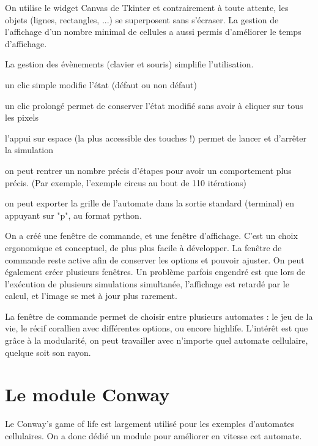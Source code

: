 \documentclass[a4paper]{article}
\begin{document}
On utilise le widget Canvas de Tkinter et contrairement à toute attente, les objets (lignes, rectangles, ...) se superposent sans s'écraser. La gestion de l'affichage d'un nombre minimal de cellules a aussi permis d'améliorer le temps d'affichage.


La gestion des évènements (clavier et souris) simplifie l'utilisation.

\begin{itemsize}


\item{un clic simple modifie l'état (défaut ou non défaut)}
\item{un clic prolongé permet de conserver l'état modifié sans avoir à cliquer sur tous les pixels}
\item{l'appui sur espace (la plus accessible des touches !) permet de lancer et d'arrêter la simulation}
\item{on peut rentrer un nombre précis d'étapes pour avoir un comportement plus précis. (Par exemple, l'exemple circus au bout de 110 itérations)}
\item{on peut exporter la grille de l'automate dans la sortie standard (terminal) en appuyant sur "p", au format python.}


\end{itemsize}

On a créé une fenêtre de commande, et une fenêtre d'affichage. C'est un choix ergonomique et conceptuel, de plus plus facile à développer. La fenêtre de commande reste active afin de conserver les options et pouvoir ajuster. On peut également créer plusieurs fenêtres. Un problème parfois engendré est que lors de l'exécution de plusieurs simulations simultanée, l'affichage est retardé par le calcul, et l'image se met à jour plus rarement.

La fenêtre de commande permet de choisir entre plusieurs automates : le jeu de la vie, le récif corallien avec différentes options, ou encore highlife. L'intérêt est que grâce à la modularité, on peut travailler avec n'importe quel automate cellulaire, quelque soit son rayon.


\section{Le module Conway}

Le Conway's game of life est largement utilisé pour les exemples d'automates cellulaires. On a donc dédié un module pour améliorer en vitesse cet automate.
\end{document}

